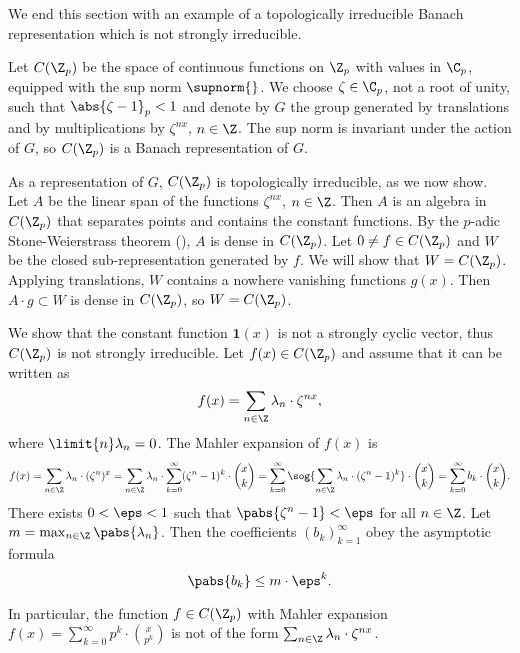 We end this section with an example of a topologically irreducible Banach representation which is not strongly irreducible.
    \begin{exmp}
    Let $C(\Z_p)$ be the space of continuous functions on $\Z_p$ with values in $\C_p$, equipped with the sup norm $\supnorm{}$.
    We choose $\zeta\in \C_p$, not a root of unity, such that $\abs{\zeta-1}_p<1$ and denote by $G$ the group generated by translations and by multiplications by $\zeta^{nx}$, $n\in\Z$.
    The sup norm is invariant under the action of $G$, so $C(\Z_p)$ is a Banach representation of $G$.
    
    As a representation of $G$, $C(\Z_p)$ is topologically irreducible, as we now show.
    Let $A$ be the linear span of the functions $\zeta^{nx}$, $n\in\Z$.
    Then $A$ is an algebra in $C(\Z_p)$ that separates points and contains the constant functions.
    By the $p$-adic Stone-Weierstrass theorem (\cite{kaplansky1995weierstrass}), $A$ is dense in $C(\Z_p)$.
    Let $0\neq f\in C(\Z_p)$ and $W$ be the closed sub-representation generated by $f$.
    We will show that $W=C(\Z_p)$.
    Applying translations, $W$ contains a nowhere vanishing functions $g(x)$.
    Then $A\cdot g\subset W$ is dense in $C(\Z_p)$, so $W=C(\Z_p)$.
    
    We show that the constant function $\textbf{1}(x)$ is not a strongly cyclic vector, thus $C(\Z_p)$ is not strongly irreducible.
    Let $f(x)\in C(\Z_p)$ and assume that it can be written as
    \[f(x)=\sum_{n\in\Z}\lambda_n\cdot \zeta^{nx},\]
    where $\limit{n}\lambda_n=0$.
    The Mahler expansion of $f(x)$ is 
        \begin{align*}
        f(x)=
        \sum_{n\in\Z}\lambda_n\cdot (\zeta^{n})^x
        =\sum_{n\in\Z}\lambda_n\cdot \sum_{k=0}^\infty (\zeta^n-1)^k\cdot\binom{x}{k}
        =\sum_{k=0}^\infty \sog{\sum_{n\in\Z}\lambda_n\cdot (\zeta^n-1)^k}\cdot\binom{x}{k}
        =\sum_{k=0}^\infty b_k\cdot\binom{x}{k}.
        \end{align*} 
    There exists $0<\eps<1$ such that $\pabs{\zeta^n-1}<\eps$ for all $n\in\Z$.
    Let $m=\max_{n\in\Z}\pabs{\lambda_n}$.
    Then the coefficients $(b_k)_{k=1}^\infty$ obey the asymptotic formula
    \[\pabs{b_k}\leq m\cdot \eps^k.\]
    
    In particular, the function $f\in C(\Z_p)$ with Mahler expansion $f(x)=\sum_{k=0}^\infty p^k\cdot\binom{x}{p^k}$ is not of the form $\sum_{n\in\Z}\lambda_n\cdot\zeta^{nx}$.
      
    \end{exmp} 